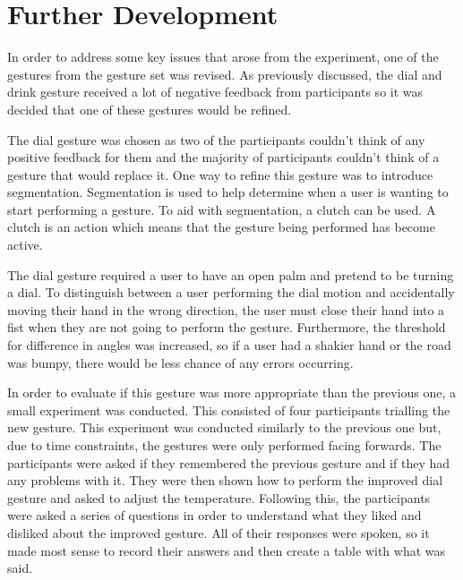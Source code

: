 \documentclass{l4proj}
\begin{document}
\section{Further Development}
In order to address some key issues that arose from the experiment, one of the gestures from the gesture set was revised. As previously discussed, the dial and drink gesture received a lot of negative feedback from participants so it was decided that one of these gestures would be refined. 

The dial gesture was chosen as two of the participants couldn't think of any positive feedback for them and the majority of participants couldn't think of a gesture that would replace it. One way to refine this gesture was to introduce segmentation. Segmentation is used to help determine when a user is wanting to start performing a gesture. To aid with segmentation, a clutch can be used. A clutch is an action which means that the gesture being performed has become active. 

The dial gesture required a user to have an open palm and pretend to be turning a dial. To distinguish between a user performing the dial motion and accidentally moving their hand in the wrong direction, the user must close their hand into a fist when they are not going to perform the gesture. Furthermore, the threshold for difference in angles was increased, so if a user had a shakier hand or the road was bumpy, there would be less chance of any errors occurring. 

In order to evaluate if this gesture was more appropriate than the previous one, a small experiment was conducted. This consisted of four participants trialling the new gesture. This experiment was conducted similarly to the previous one but, due to time constraints, the gestures were only performed facing forwards. The participants were asked if they remembered the previous gesture and if they had any problems with it. They were then shown how to perform the improved dial gesture and asked to adjust the temperature. Following this, the participants were asked a series of questions in order to understand what they liked and disliked about the improved gesture. All of their responses were spoken, so it made most sense to record their answers and then create a table with what was said.
\end{document}
